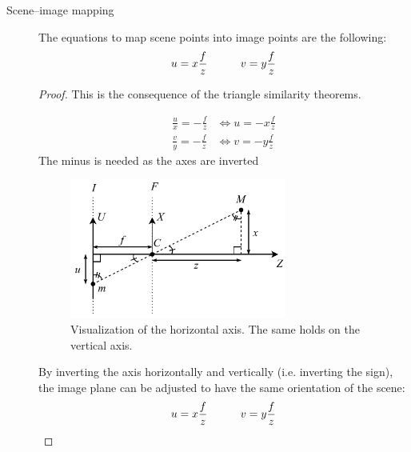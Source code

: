 \begin{description}
    \item[Scene--image mapping] 
        The equations to map scene points into image points are the following:
        \[ u = x \frac{f}{z} \hspace*{3em} v = y \frac{f}{z} \]

        \begin{proof}
            This is the consequence of the triangle similarity theorems.

            \begin{minipage}{0.45\textwidth}
                \[ 
                    \begin{split}
                        \frac{u}{x} = -\frac{f}{z} &\iff u = -x \frac{f}{z} \\
                        \frac{v}{y} = -\frac{f}{z} &\iff v = -y \frac{f}{z} 
                    \end{split}
                \]
                The minus is needed as the axes are inverted
            \end{minipage}
            \begin{minipage}{0.50\textwidth}
                \begin{figure}[H]
                    \centering
                    \includegraphics[width=0.7\textwidth]{./img/_perspective_projection_eq_proof.pdf}
                    \caption{\small Visualization of the horizontal axis. The same holds on the vertical axis.}
                \end{figure}
            \end{minipage}

            By inverting the axis horizontally and vertically (i.e. inverting the sign), 
            the image plane can be adjusted to have the same orientation of the scene:
            \[ u = x \frac{f}{z} \hspace*{3em} v = y \frac{f}{z} \]
        \end{proof}


\end{description}
